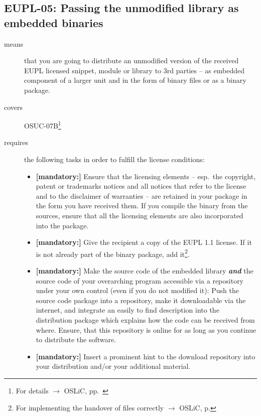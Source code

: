 \subsection{EUPL-05: Passing the unmodified library as embedded binaries} 
\label{OSUC-07B-EUPL}

\begin{description}
\item[means] that you are going to distribute an unmodified version of the
received EUPL licensed snippet, module or library to 3rd parties -- as embedded
component of a larger unit and in the form of binary files or as a bi\-na\-ry
package.

\item[covers] OSUC-07B\footnote{For details $\rightarrow$
OSLiC, pp.\ \pageref{OSUC-07B-DEF}}

\item[requires] the following tasks in order to fulfill the license conditions:
\begin{itemize}
  
  \item \textbf{[mandatory:]} Ensure that the licensing elements -- esp.\ the
  copyright, patent or trademarks notices and all notices that refer to the
  license and to the disclaimer of warranties -- are retained in your package in
  the form you have received them. If you compile the binary from the sources,
  ensure that all the licensing elements are also incorporated into the package.
  
  \item \textbf{[mandatory:]} Give the recipient a copy of the EUPL 1.1
  license. If it is not already part of the binary package, add
  it\footnote{For implementing the handover of files correctly $\rightarrow$
  OSLiC, p. \pageref{DistributingFilesHint}}.

  \item \textbf{[mandatory:]} Make the source code of the embedded library
  \textbf{\emph{and}} the source code of your overarching program accessible via
  a repository under your own control (even if you do not modified it): Push the
  source code package into a repository, make it downloadable via the internet,
  and integrate an easily to find description into the distribution package
  which explains how the code can be received from where. Ensure, that this
  repository is online for as long as you continue to distribute the software.
  
  \item \textbf{[mandatory:]} Insert a prominent hint to the download repository
  into your distribution and/or your additional material.
  

\end{itemize}
\end{description}
